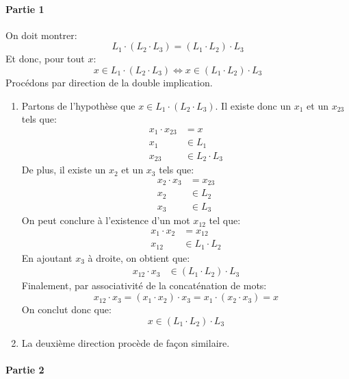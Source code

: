 \documentclass[12pt,french,a4paper]{article}
\begin{document}
\begin{question}
\paragraph{Partie 1}
On doit montrer:
\[
L_1 \cdot (L_2 \cdot L_3) = (L_1 \cdot L_2) \cdot L_3
\]
Et donc, pour tout $x$:
\[
x \in L_1 \cdot (L_2 \cdot L_3) \iff x \in (L_1 \cdot L_2) \cdot L_3
\]
Procédons par direction de la double implication.
\begin{enumerate}
\item
Partons de l'hypothèse que $x \in L_1 \cdot (L_2 \cdot L_3)$.
Il existe donc un $x_1$ et un $x_{23}$ tels que:
\begin{align*}
x_1 \cdot x_{23} &= x\\
x_1 &\in L_1\\
x_{23} &\in L_2 \cdot L_3
\end{align*}
De plus, il existe un $x_2$ et un $x_3$ tels que:
\begin{align*}
x_2 \cdot x_3 &= x_{23}\\
x_2 &\in L_2\\
x_3 &\in L_3
\end{align*}
On peut conclure à l'existence d'un mot $x_{12}$ tel que:
\begin{align*}
x_1 \cdot x_2 &= x_{12}\\
x_{12} &\in L_1 \cdot L_2
\end{align*}
En ajoutant $x_3$ à droite, on obtient que:
\begin{align*}
x_{12} \cdot x_3 &\in (L_1 \cdot L_2) \cdot L_3
\end{align*}
Finalement, par associativité de la concaténation de mots:
\[
x_{12} \cdot x_3 = (x_1 \cdot x_2) \cdot x_3 = x_1 \cdot (x_2 \cdot x_3) = x
\]
On conclut donc que:
\[
x \in (L_1 \cdot L_2) \cdot L_3
\]
\item La deuxième direction procède de façon similaire.
\end{enumerate}

\paragraph{Partie 2}


\end{question}
\end{document}
